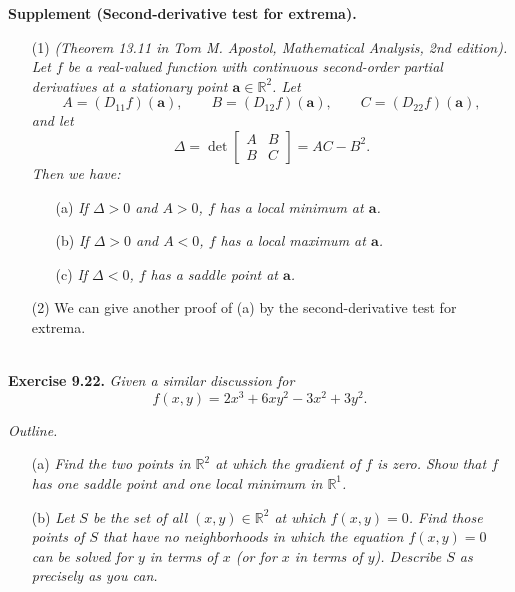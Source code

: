 \documentclass{article}
\begin{document}
\textbf{Supplement (Second-derivative test for extrema).}
\begin{enumerate}
\item[(1)]
  \emph{(Theorem 13.11 in Tom M. Apostol, Mathematical Analysis, 2nd edition).
  Let $f$ be a real-valued function with
  continuous second-order partial derivatives at a stationary point $\mathbf{a} \in \mathbb{R}^2$.
  Let
  \[
    A = (D_{11}f)(\mathbf{a}),
    \qquad
    B = (D_{12}f)(\mathbf{a}),
    \qquad
    C = (D_{22}f)(\mathbf{a}),
  \]
  and let
  \[
    \Delta
    = \det\begin{bmatrix}
      A & B \\
      B & C
    \end{bmatrix}
    = AC - B^2.
  \]
  Then we have:}
  \begin{enumerate}
  \item[(a)]
    \emph{If $\Delta > 0$ and $A > 0$, $f$ has a local minimum at $\mathbf{a}$.}

  \item[(b)]
    \emph{If $\Delta > 0$ and $A < 0$, $f$ has a local maximum at $\mathbf{a}$.}

  \item[(c)]
    \emph{If $\Delta < 0$, $f$ has a saddle point at $\mathbf{a}$.}
  \end{enumerate}

\item[(2)]
  We can give another proof of (a) by the second-derivative test for extrema. \\\\
\end{enumerate}






\textbf{Exercise 9.22.}
\emph{Given a similar discussion for}
\[
  f(x,y) = 2x^3+6xy^2-3x^2+3y^2.
\]



\emph{Outline.}
\begin{enumerate}
\item[(a)]
  \emph{Find the two points in $\mathbb{R}^2$ at which the gradient of $f$ is zero.
  Show that $f$ has one saddle point and one local minimum in $\mathbb{R}^1$.}

\item[(b)]
  \emph{Let $S$ be the set of all $(x,y) \in \mathbb{R}^2$ at which $f(x,y) = 0$.
  Find those points of $S$ that have no neighborhoods in which the equation
  $f(x,y) = 0$ can be solved for $y$ in terms of $x$ (or for $x$ in terms of $y$).
  Describe $S$ as precisely as you can.} \\
\end{enumerate}
\end{document}
